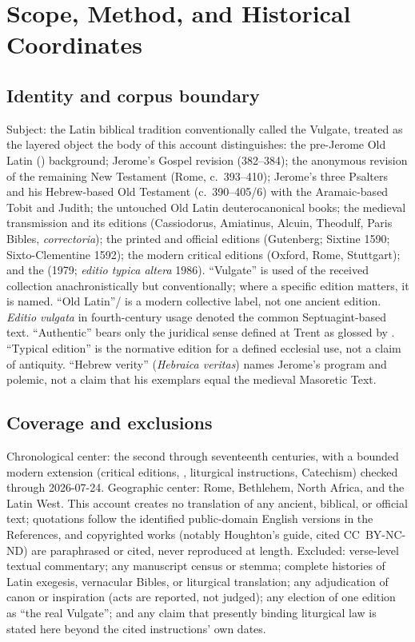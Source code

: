 \section{Scope, Method, and Historical Coordinates}

\subsection{Identity and corpus boundary}

Subject: the Latin biblical tradition conventionally called the Vulgate,
treated as the layered object the body of this account distinguishes: the
pre-Jerome Old Latin () background; Jerome's Gospel
revision (382--384); the anonymous revision of the remaining New
Testament (Rome, c.~393--410); Jerome's three Psalters and his
Hebrew-based Old Testament (c.~390--405/6) with the Aramaic-based Tobit
and Judith; the untouched Old Latin deuterocanonical books; the medieval
transmission and its editions (Cassiodorus, Amiatinus, Alcuin, Theodulf,
Paris Bibles, \textit{correctoria}); the printed and official editions
(Gutenberg; Sixtine 1590; Sixto-Clementine 1592); the modern critical
editions (Oxford, Rome, Stuttgart); and the  (1979;
\textit{editio typica altera} 1986). ``Vulgate'' is used of the received
collection anachronistically but conventionally; where a specific edition
matters, it is named. ``Old Latin''/ is a modern
collective label, not one ancient edition. \textit{Editio vulgata} in
fourth-century usage denoted the common Septuagint-based text.
``Authentic'' bears only the juridical sense defined at Trent as glossed
by . ``Typical edition'' is the normative
edition for a defined ecclesial use, not a claim of antiquity.
``Hebrew verity'' (\textit{Hebraica veritas}) names Jerome's program and
polemic, not a claim that his exemplars equal the medieval Masoretic
Text.

\subsection{Coverage and exclusions}

Chronological center: the second through seventeenth centuries, with a
bounded modern extension (critical editions, ,
liturgical instructions, Catechism) checked through 2026-07-24.
Geographic center: Rome, Bethlehem, North Africa, and the Latin West.
This account creates no translation of any ancient, biblical, or official
text; quotations follow the identified public-domain English versions in
the References, and copyrighted works (notably Houghton's guide, cited
CC~BY-NC-ND) are paraphrased or cited, never reproduced at length.
Excluded: verse-level textual commentary; any manuscript census or
stemma; complete histories of Latin exegesis, vernacular Bibles, or
liturgical translation; any adjudication of canon or inspiration (acts
are reported, not judged); any election of one edition as ``the real
Vulgate''; and any claim that presently binding liturgical law is stated
here beyond the cited instructions' own dates.

